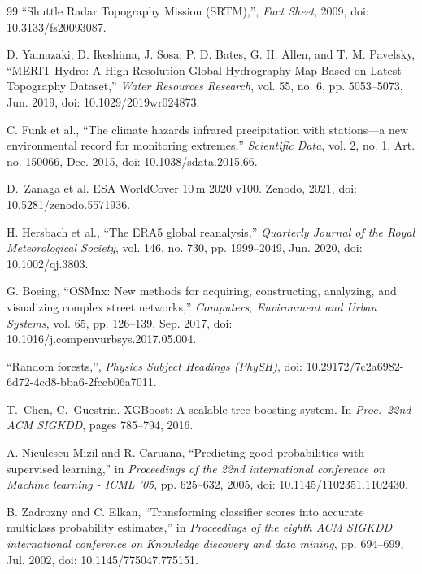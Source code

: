 \documentclass[10pt,twocolumn]{article}
\begin{document}
{\begin{thebibliography}{99}
``Shuttle Radar Topography Mission (SRTM),'', \emph{Fact Sheet}, 2009, doi: 10.3133/fs20093087.

D. Yamazaki, D. Ikeshima, J. Sosa, P. D. Bates, G. H. Allen, and T. M. Pavelsky, ``MERIT Hydro: A High-Resolution Global Hydrography Map Based on Latest Topography Dataset,'' \emph{Water Resources Research}, vol. 55, no. 6, pp. 5053--5073, Jun. 2019, doi: 10.1029/2019wr024873.

C. Funk et al., ``The climate hazards infrared precipitation with stations---a new environmental record for monitoring extremes,'' \emph{Scientific Data}, vol. 2, no. 1, Art. no. 150066, Dec. 2015, doi: 10.1038/sdata.2015.66.

D.~Zanaga et al. ESA WorldCover 10\,m 2020 v100. Zenodo, 2021, doi: 10.5281/zenodo.5571936.

H. Hersbach et al., ``The ERA5 global reanalysis,'' \emph{Quarterly Journal of the Royal Meteorological Society}, vol. 146, no. 730, pp. 1999--2049, Jun. 2020, doi: 10.1002/qj.3803.

G. Boeing, ``OSMnx: New methods for acquiring, constructing, analyzing, and visualizing complex street networks,'' \emph{Computers, Environment and Urban Systems}, vol. 65, pp. 126--139, Sep. 2017, doi: 10.1016/j.compenvurbsys.2017.05.004.

``Random forests,'', \emph{Physics Subject Headings (PhySH)}, doi: 10.29172/7c2a6982-6d72-4cd8-bba6-2fccb06a7011.

T.~Chen, C.~Guestrin. XGBoost: A scalable tree boosting system. In \emph{Proc.\ 22nd ACM SIGKDD}, pages 785--794, 2016.

A. Niculescu-Mizil and R. Caruana, ``Predicting good probabilities with supervised learning,'' in \emph{Proceedings of the 22nd international conference on Machine learning - ICML '05}, pp. 625--632, 2005, doi: 10.1145/1102351.1102430.

B. Zadrozny and C. Elkan, ``Transforming classifier scores into accurate multiclass probability estimates,'' in \emph{Proceedings of the eighth ACM SIGKDD international conference on Knowledge discovery and data mining}, pp. 694--699, Jul. 2002, doi: 10.1145/775047.775151.


\end{thebibliography}}
\end{document}
